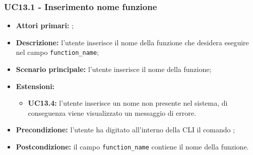\subsubsection{UC13.1 - Inserimento nome funzione}
\begin{itemize}
	\item \textbf{Attori primari:} \ua{};
	\item \textbf{Descrizione:} l’utente inserisce il nome della funzione che desidera eseguire nel campo \texttt{function\_name};
	\item \textbf{Scenario principale:} l'utente inserisce il nome della funzione; 
	\item \textbf{Estensioni:} 
	\begin{itemize}
		\item \textbf{UC13.4:} l’utente inserisce un nome non presente nel sistema, di conseguenza viene visualizzato un messaggio di errore.
	\end{itemize}
	\item \textbf{Precondizione:} l’utente ha digitato all’interno della CLI il comando \run{};
	\item \textbf{Postcondizione:}  il campo \texttt{function\_name} contiene il nome della funzione.
\end{itemize}